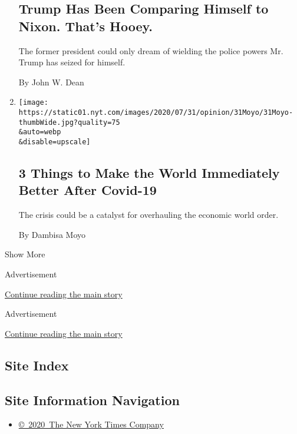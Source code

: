 \begin{enumerate}
  \hypertarget{trump-has-been-comparing-himself-to-nixon-thats-hooey}{%
  \subsection{Trump Has Been Comparing Himself to Nixon. That's
  Hooey.}\label{trump-has-been-comparing-himself-to-nixon-thats-hooey}}

  The former president could only dream of wielding the police powers
  Mr. Trump has seized for himself.

  By John W. Dean
\item
  \href{/2020/07/31/opinion/coronavirus-economy.html}{}

  \texttt{[image: https://static01.nyt.com/images/2020/07/31/opinion/31Moyo/31Moyo-thumbWide.jpg?quality=75\\\&auto=webp\\\&disable=upscale]}

  \hypertarget{3-things-to-make-the-world-immediately-better-after-covid-19}{%
  \subsection{3 Things to Make the World Immediately Better After
  Covid-19}\label{3-things-to-make-the-world-immediately-better-after-covid-19}}

  The crisis could be a catalyst for overhauling the economic world
  order.

  By Dambisa Moyo
\end{enumerate}

Show More

Advertisement

\protect\hyperlink{after-mid2}{Continue reading the main story}

Advertisement

\protect\hyperlink{after-mktg}{Continue reading the main story}

\hypertarget{site-index}{%
\subsection{Site Index}\label{site-index}}

\hypertarget{site-information-navigation}{%
\subsection{Site Information
Navigation}\label{site-information-navigation}}

\begin{itemize}
\tightlist
\item
  \href{https://help.nytimes.com/hc/en-us/articles/115014792127-Copyright-notice}{©~2020~The
  New York Times Company}
\end{itemize}


